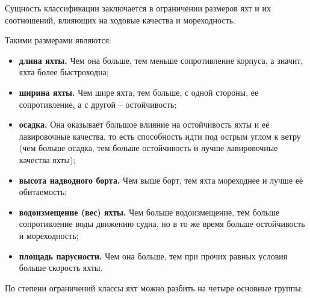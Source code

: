\documentclass[a4paper, 12pt, twoside, final]{scrbook}
\begin{document}
Сущность классификации заключается в ограничении размеров яхт и их
соотношений, влияющих на ходовые качества и мореходность.

Такими размерами являются:
\begin{itemize}
\item \textbf{длина яхты.} Чем она больше, тем меньше сопротивление корпуса,
а значит, яхта более быстроходна;
\item \textbf{ширина яхты.} Чем шире яхта, тем больше, с одной стороны,
ее сопротивление, а с другой \--- остойчивость;
\item \textbf{осадка.} Она оказывает большое влияние на остойчивость яхты
и её лавировочные качества, то есть способность идти под острым углом
к ветру (чем больше осадка, тем больше остойчивость и лучше лавировочные
качества яхты);
\item \textbf{высота надводного борта.} Чем выше борт, тем яхта мореходнее
и лучше её обитаемость;
\item \textbf{водоизмещение (вес) яхты.} Чем больше водоизмещение, тем больше
сопротивление воды движению судна, но в то же время больше остойчивость
и мореходность;
\item \textbf{площадь парусности.} Чем она больше, тем при прочих равных
условия больше скорость яхты.
\end{itemize}
По степени ограничений классы яхт можно разбить на четыре основные
группы:
\end{document}
